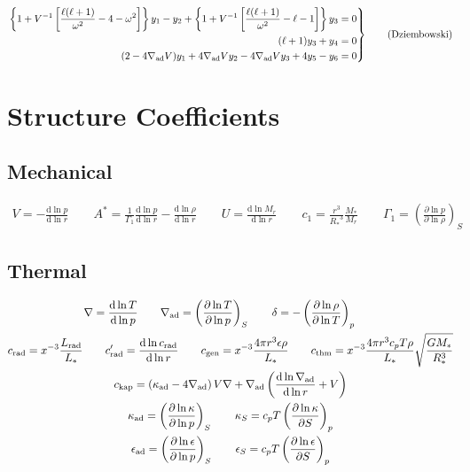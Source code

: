 \documentclass{article}
\newcommand{\diff}{\ensuremath{\mathrm{d}}}
\newcommand{\As}{\ensuremath{A^{\ast}}}
\newcommand{\nabad}{\ensuremath{\nabla_{\rm ad}}}
\newcommand{\kapad}{\ensuremath{\kappa_{\rm ad}}}
\newcommand{\kapS}{\ensuremath{\kappa_{S}}}
\newcommand{\epsad}{\ensuremath{\epsilon_{\rm ad}}}
\newcommand{\epsS}{\ensuremath{\epsilon_{S}}}
\newcommand{\crad}{\ensuremath{c_{\rm rad}}}
\newcommand{\cgen}{\ensuremath{c_{\rm gen}}}
\newcommand{\cthm}{\ensuremath{c_{\rm thm}}}
\newcommand{\ckap}{\ensuremath{c_{\rm kap}}}
\newcommand{\Rstar}{\ensuremath{R_{\ast}}}
\newcommand{\Mstar}{\ensuremath{M_{\ast}}}
\newcommand{\Lrad}{\ensuremath{L_{\rm rad}}}
\newcommand{\Lstar}{\ensuremath{L_{\ast}}}
\begin{document}
\begin{equation*}
\left.
\begin{aligned}
\left\{ 1 + V^{-1} \left[ \frac{\ell(\ell+1)}{\omega^{2}} - 4 - \omega^{2} \right] \right\} y_{1} -
y_{2} +
\left\{ 1 + V^{-1} \left[ \frac{\ell(\ell+1)}{\omega^{2}} - \ell - 1 \right] \right\} y_{3} &= 0 \\
(\ell + 1) y_{3} + y_{4} &= 0 \\
(2 - 4\nabad V) y_{1} + 4 \nabad V y_{2} - 4 \nabad V y_{3} + 4 y_{5} - y_{6} &= 0
\end{aligned}
\right\} \qquad \text{(Dziembowski)}
\end{equation*}


\section*{Structure Coefficients}

\subsection*{Mechanical}

\begin{gather*}
V = -\frac{\diff \ln p}{\diff \ln r} \qquad
\As = \frac{1}{\Gamma_{1}} \frac{\diff \ln p}{\diff \ln r} - \frac{\diff \ln \rho}{\diff \ln r} \qquad
U = \frac{\diff \ln M_{r}}{\diff \ln r} \qquad
c_1 = \frac{r^{3}}{\Rstar^{3}} \frac{\Mstar}{M_{r}} \qquad
\Gamma_{1} = \left( \frac{\partial \ln p}{\partial \ln \rho} \right)_{S}
\end{gather*}

\subsection*{Thermal}

\begin{gather*}
\nabla = \frac{\diff \ln T}{\diff \ln p} \qquad
\nabad = \left( \frac{\partial \ln T}{\partial \ln p} \right)_{S} \qquad
\delta = - \left( \frac{\partial \ln \rho}{\partial \ln T} \right)_{p} \qquad \\
\crad = x^{-3} \frac{\Lrad}{\Lstar} \qquad
\crad' = \frac{\diff \ln \crad}{\diff \ln r} \qquad
\cgen = x^{-3} \frac{4\pi r^{3} \epsilon \rho}{\Lstar} \qquad
\cthm = x^{-3} \frac{4\pi r^{3} c_{p} T \rho}{\Lstar} \sqrt{\frac{G\Mstar}{\Rstar^{3}}} \\
\ckap = \left( \kapad - 4 \nabad \right) V \nabla + \nabad \left( \frac{\diff \ln \nabad}{\diff \ln r} + V \right) \\
\kapad = \left( \frac{\partial \ln \kappa}{\partial \ln p} \right)_{S} \qquad
\kapS = c_{p} T \left( \frac{\partial \ln \kappa}{\partial S} \right)_{p} \\
\epsad = \left( \frac{\partial \ln \epsilon}{\partial \ln p} \right)_{S} \qquad
\epsS = c_{p} T \left( \frac{\partial \ln \epsilon}{\partial S} \right)_{p}
\end{gather*}
\end{document}
